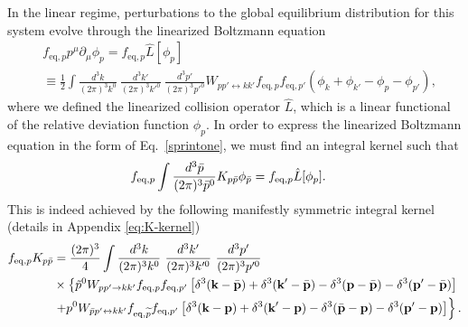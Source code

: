\documentclass[aps,prd,preprint,nofootinbib,amsmath,amssymb,showpacs,longbibliography,singlecolumn,superscriptaddress,10pt]{revtex4-1}
\theoremstyle{plain}
\theoremstyle{definition}
\begin{document}
In the linear regime, perturbations to the global equilibrium distribution for this system evolve through the linearized Boltzmann equation
%
\begin{equation}
\label{Lhat}
\begin{aligned}
&
f_{\mathrm{eq},p}
p^{\mu}\partial_{\mu}\phi_p
=
f_{\mathrm{eq},p}
\hat{L}[\phi_{p}] \\
&
\equiv
\frac{1}{2}\int \frac{d^{3}k}{(2 \pi)^{3} k^{0}} \ \frac{d^{3}k'}{(2 \pi)^{3} k'^{0}} \ \frac{d^{3}p'}{(2 \pi)^{3} p'^{0}}  W_{pp' \leftrightarrow kk'} f_{\mathrm{eq},p} f_{\mathrm{eq},p'} (  \phi_{k} + \phi_{k'} - \phi_{p} - \phi_{p'}  ),
\end{aligned}    
\end{equation}
%
where we defined the linearized collision operator $\hat{L}$, which is a linear functional of the relative deviation function $\phi_{p}$. In order to express the linearized Boltzmann equation in the form of Eq.~\eqref{sprintone}, we must find an integral kernel such that 
%
\begin{equation}
\label{eq:fund-K-prop}
\begin{aligned}
&
f_{\text{eq},p} \int \dfrac{d^3 \Bar{p}}{(2\pi)^3 \Bar{p}^0} K_{p\Bar{p}} \phi_{\Bar{p}}
=
f_{\text{eq},p}
\Hat{L}[\phi_{p}].
\end{aligned}    
\end{equation}
%
This is indeed achieved by the following manifestly symmetric integral kernel 
 (details in Appendix \ref{eq:K-kernel})
%
\begin{equation}
\label{eq:kernel-K}
\begin{aligned}
f_{\mathrm{eq},p}
K_{p \Bar{p}} 
&
= 
\frac{(2\pi)^3}{4} \int \frac{d^3k}{(2\pi)^3 k^0}  \ \frac{d^{3}k'}{(2 \pi)^{3} k'^{0}} \ \frac{d^{3}p'}{(2 \pi)^{3} p'^{0}} \,  
\\
&
\times
\left\{ 
\tilde{p}^0   W_{pp' \rightarrow kk'} f_{\mathrm{eq},p} f_{\mathrm{eq},p'}
\left[ \delta^{3}(\textbf{k}-\Bar{\textbf{p}}) + \delta^{3}(\textbf{k}'-\Bar{\textbf{p}}) 
- \delta^{3}(\textbf{p}-\Bar{\textbf{p}}) - \delta^{3}(\textbf{p}'-\Bar{\textbf{p}}) \right]
\right.
\\
&
\left.
+
p^{0} W_{\Bar{p}p' \leftrightarrow kk'} f_{\mathrm{eq},\widetilde{p}} f_{\mathrm{eq},p'}  
\left[\delta^{3}(\textbf{k} - \textbf{p} ) 
+ 
 \delta^{3}(\textbf{k}' - \textbf{p}) 
- 
\delta^{3}(\Bar{\textbf{p}} - \textbf{p}) 
- 
\delta^{3}(\textbf{p}' - \textbf{p})  \right]
\right\}.
\end{aligned}
\end{equation}
\end{document}
